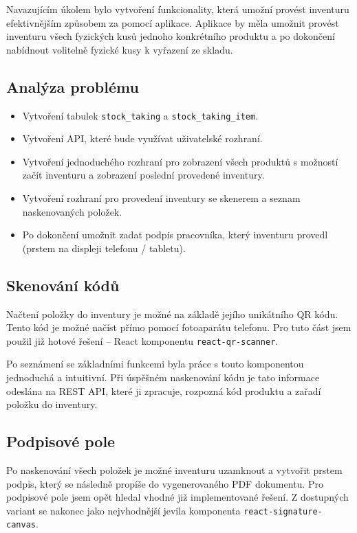 Navazujícím úkolem bylo vytvoření funkcionality, která umožní provést inventuru efektivnějším způsobem za pomocí aplikace. Aplikace by měla umožnit provést inventuru všech fyzických kusů jednoho konkrétního produktu a po dokončení nabídnout volitelně fyzické kusy k vyřazení ze skladu. 

\subsection{Analýza problému}

\begin{itemize}
    \item Vytvoření tabulek \lstinline{stock_taking} a \lstinline{stock_taking_item}.
    \item Vytvoření API, které bude využívat uživatelské rozhraní.
    \item Vytvoření jednoduchého rozhraní pro zobrazení všech produktů s možností začít inventuru a zobrazení poslední provedené inventury.
    \item Vytvoření rozhraní pro provedení inventury se skenerem a seznam naskenovaných položek.
    \item Po dokončení umožnit zadat podpis pracovníka, který inventuru provedl (prstem na displeji telefonu / tabletu).
\end{itemize}

\subsection{Skenování kódů}

Načtení položky do inventury je možné na základě jejího unikátního QR kódu. Tento kód je možné načíst přímo pomocí fotoaparátu telefonu. Pro tuto část jsem použil již hotové řešení -- React komponentu \lstinline{react-qr-scanner}. 

Po seznámení se základními funkcemi byla práce s touto komponentou jednoduchá a intuitivní. Při úspěšném naskenování kódu je tato informace odeslána na REST API, které ji zpracuje, rozpozná kód produktu a zařadí položku do inventury. 

\subsection{Podpisové pole}

Po naskenování všech položek je možné inventuru uzamknout a vytvořit prstem podpis, který se následně propíše do vygenerovaného PDF dokumentu. Pro podpisové pole jsem opět hledal vhodné již implementované řešení. Z dostupných variant se nakonec jako nejvhodnější jevila komponenta \lstinline{react-signature-canvas}. 


